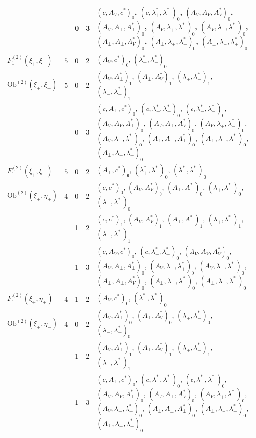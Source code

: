 \documentclass[11pt]{article}
\numberwithin{equation}{section}
\theoremstyle{plain}
\theoremstyle{definition}
\newcommand{\Ob}{\mathrm{Ob}}
\begin{document}
{\begin{longtable}{>{\raggedright}p{2.3cm}|p{0.6cm}|p{0.25cm}|p{0.25cm}|>{\raggedright\arraybackslash}p{11.6cm}}
 &  & 0 & 3 & $(c,A_V,c^*)_{0}$, $(c,\lambda^*_+,\lambda^*_-)_{0}$, $(A_V,A_V,A^*_V)_{0}$, $(A_V,A_\perp,A^*_\perp)_{0}$, $(A_V,\lambda_+,\lambda^*_+)_{0}$, $(A_V,\lambda_-,\lambda^*_-)_{0}$, $(A_\perp,A_\perp,A^*_V)_{0}$, $(A_\perp,\lambda_+,\lambda^*_-)_{0}$, $(A_\perp,\lambda_-,\lambda^*_+)_{0}$ \\
\hline
$F_1^{(2)}(\xi_+,\xi_-)$ & $5$ & 0 & 2 & $(A_V,c^*)_{0}$, $(\lambda^*_+,\lambda^*_-)_{0}$ \\
\hline
$\Ob^{(2)}(\xi_+,\xi_+)$ & $5$ & 0 & 2 & $(A_V,A^*_\perp)_{1}$, $(A_\perp,A^*_V)_{1}$, $(\lambda_+,\lambda^*_-)_{1}$, $(\lambda_-,\lambda^*_+)_{1}$ \\
 &  & 0 & 3 & $(c,A_\perp,c^*)_{0}$, $(c,\lambda^*_+,\lambda^*_+)_{0}$, $(c,\lambda^*_-,\lambda^*_-)_{0}$, $(A_V,A_V,A^*_\perp)_{0}$, $(A_V,A_\perp,A^*_V)_{0}$, $(A_V,\lambda_+,\lambda^*_-)_{0}$, $(A_V,\lambda_-,\lambda^*_+)_{0}$, $(A_\perp,A_\perp,A^*_\perp)_{0}$, $(A_\perp,\lambda_+,\lambda^*_+)_{0}$, $(A_\perp,\lambda_-,\lambda^*_-)_{0}$ \\
\hline
$F_1^{(2)}(\xi_+,\xi_+)$ & $5$ & 0 & 2 & $(A_\perp,c^*)_{0}$, $(\lambda^*_+,\lambda^*_+)_{0}$, $(\lambda^*_-,\lambda^*_-)_{0}$ \\
\hline
$\Ob^{(2)}(\xi_+,\eta_+)$ & $4$ & 0 & 2 & $(c,c^*)_{0}$, $(A_V,A^*_V)_{0}$, $(A_\perp,A^*_\perp)_{0}$, $(\lambda_+,\lambda^*_+)_{0}$, $(\lambda_-,\lambda^*_-)_{0}$ \\
 &  & 1 & 2 & $(c,c^*)_{1}$, $(A_V,A^*_V)_{1}$, $(A_\perp,A^*_\perp)_{1}$, $(\lambda_+,\lambda^*_+)_{1}$, $(\lambda_-,\lambda^*_-)_{1}$ \\
 &  & 1 & 3 & $(c,A_V,c^*)_{0}$, $(c,\lambda^*_+,\lambda^*_-)_{0}$, $(A_V,A_V,A^*_V)_{0}$, $(A_V,A_\perp,A^*_\perp)_{0}$, $(A_V,\lambda_+,\lambda^*_+)_{0}$, $(A_V,\lambda_-,\lambda^*_-)_{0}$, $(A_\perp,A_\perp,A^*_V)_{0}$, $(A_\perp,\lambda_+,\lambda^*_-)_{0}$, $(A_\perp,\lambda_-,\lambda^*_+)_{0}$ \\
\hline
$F_1^{(2)}(\xi_+,\eta_+)$ & $4$ & 1 & 2 & $(A_V,c^*)_{0}$, $(\lambda^*_+,\lambda^*_-)_{0}$ \\
\hline
$\Ob^{(2)}(\xi_+,\eta_-)$ & $4$ & 0 & 2 & $(A_V,A^*_\perp)_{0}$, $(A_\perp,A^*_V)_{0}$, $(\lambda_+,\lambda^*_-)_{0}$, $(\lambda_-,\lambda^*_+)_{0}$ \\
 &  & 1 & 2 & $(A_V,A^*_\perp)_{1}$, $(A_\perp,A^*_V)_{1}$, $(\lambda_+,\lambda^*_-)_{1}$, $(\lambda_-,\lambda^*_+)_{1}$ \\
 &  & 1 & 3 & $(c,A_\perp,c^*)_{0}$, $(c,\lambda^*_+,\lambda^*_+)_{0}$, $(c,\lambda^*_-,\lambda^*_-)_{0}$, $(A_V,A_V,A^*_\perp)_{0}$, $(A_V,A_\perp,A^*_V)_{0}$, $(A_V,\lambda_+,\lambda^*_-)_{0}$, $(A_V,\lambda_-,\lambda^*_+)_{0}$, $(A_\perp,A_\perp,A^*_\perp)_{0}$, $(A_\perp,\lambda_+,\lambda^*_+)_{0}$, $(A_\perp,\lambda_-,\lambda^*_-)_{0}$ \\

\end{longtable}}
\end{document}
